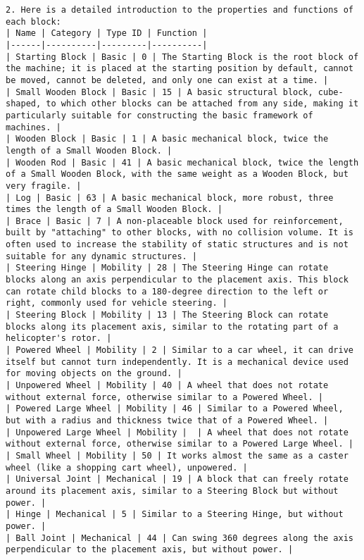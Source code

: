 \begin{lstlisting}
2. Here is a detailed introduction to the properties and functions of each block:
| Name | Category | Type ID | Function |
|------|----------|---------|----------|
| Starting Block | Basic | 0 | The Starting Block is the root block of the machine; it is placed at the starting position by default, cannot be moved, cannot be deleted, and only one can exist at a time. |
| Small Wooden Block | Basic | 15 | A basic structural block, cube-shaped, to which other blocks can be attached from any side, making it particularly suitable for constructing the basic framework of machines. |
| Wooden Block | Basic | 1 | A basic mechanical block, twice the length of a Small Wooden Block. |
| Wooden Rod | Basic | 41 | A basic mechanical block, twice the length of a Small Wooden Block, with the same weight as a Wooden Block, but very fragile. |
| Log | Basic | 63 | A basic mechanical block, more robust, three times the length of a Small Wooden Block. |
| Brace | Basic | 7 | A non-placeable block used for reinforcement, built by "attaching" to other blocks, with no collision volume. It is often used to increase the stability of static structures and is not suitable for any dynamic structures. |
| Steering Hinge | Mobility | 28 | The Steering Hinge can rotate blocks along an axis perpendicular to the placement axis. This block can rotate child blocks to a 180-degree direction to the left or right, commonly used for vehicle steering. |
| Steering Block | Mobility | 13 | The Steering Block can rotate blocks along its placement axis, similar to the rotating part of a helicopter's rotor. |
| Powered Wheel | Mobility | 2 | Similar to a car wheel, it can drive itself but cannot turn independently. It is a mechanical device used for moving objects on the ground. |
| Unpowered Wheel | Mobility | 40 | A wheel that does not rotate without external force, otherwise similar to a Powered Wheel. |
| Powered Large Wheel | Mobility | 46 | Similar to a Powered Wheel, but with a radius and thickness twice that of a Powered Wheel. |
| Unpowered Large Wheel | Mobility |  | A wheel that does not rotate without external force, otherwise similar to a Powered Large Wheel. |
| Small Wheel | Mobility | 50 | It works almost the same as a caster wheel (like a shopping cart wheel), unpowered. |
| Universal Joint | Mechanical | 19 | A block that can freely rotate around its placement axis, similar to a Steering Block but without power. |
| Hinge | Mechanical | 5 | Similar to a Steering Hinge, but without power. |
| Ball Joint | Mechanical | 44 | Can swing 360 degrees along the axis perpendicular to the placement axis, but without power. |

\end{lstlisting}
